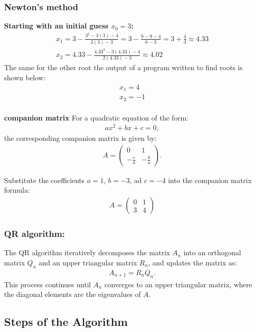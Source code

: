 \documentclass{beamer}
\theoremstyle{remark}
\newcommand{\myvec}[1]{\ensuremath{\begin{pmatrix}#1\end{pmatrix}}}
\numberwithin{equation}{section}
\begin{document}
\begin{frame}
\frametitle{Newton's method}
\textbf{Starting with an initial guess \( x_0 = 3 \):}
\begin{align}
    x_1 = 3 - \frac{3^2 - 3(3) - 4}{2(3) - 3} = 3 - \frac{9 - 9 - 4}{6 - 3} = 3 + \frac{4}{3} \approx 4.33 \\
    x_2 = 4.33 - \frac{4.33^2 - 3(4.33) - 4}{2(4.33) - 3} \approx 4.02
\end{align}
The same for the other root the output of a program written to find roots is shown below:
	\begin{align}
		x_1 = 4\\
		x_2 = -1\\
	\end{align}
\end{frame}
\begin{frame}

\textbf{companion matrix}
For a quadratic equation of the form:
\begin{align}
    ax^2 + bx + c = 0,
\end{align}
the corresponding companion matrix is given by:
\begin{align}
    A = 
    \myvec{
        0 & 1 \\
        -\frac{c}{a} & -\frac{b}{a}
    }.
\end{align}

Substitute the coefficients $a = 1$, $b = -3$, ad $c = -4$ into the companion matrix formula:
\begin{align}
    A = 
    \myvec{
        0 & 1 \\
        3 & 4
    }
\end{align}
\end{frame}
\begin{frame}
\frametitle{QR algorithm:}
The QR algorithm iteratively decomposes the matrix $A_n$ into an orthogonal matrix $Q_n$ and an upper triangular matrix $R_n$, and updates the matrix as:
\begin{align}
    A_{n+1} = R_n Q_n.
\end{align}
This process continues until $A_n$ converges to an upper triangular matrix, where the diagonal elements are the eigenvalues of $A$.

\subsection*{Steps of the Algorithm}


\end{frame}
\end{document}

